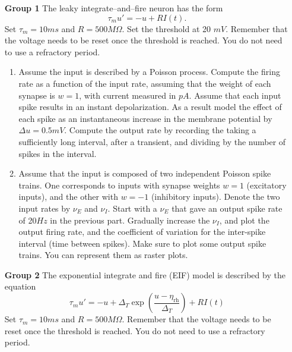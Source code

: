 \documentclass[12pt]{article}
\begin{document}
\begin{enumerate}
\item[\bf Group 1]  The leaky integrate--and--fire neuron has the form
$$
\tau_m u' = - u + R I(t).
$$
Set $\tau_m = 10 ms$ and $R = 500M \Omega$.  Set the threshold at 20 $mV$. Remember that the voltage needs to be reset once the threshold is reached.  You do not need to use a refractory period.   

\begin{enumerate}
\item Assume the input is described by a Poisson process. Compute the firing rate as a function of the input rate, assuming that the weight of each synapse is $w = 1$,
with current measured in $pA$.  Assume that each input spike results in an instant depolarization.  As a result model the effect of each spike as  an instantaneous increase in the membrane potential
by $\Delta u = 0.5mV$.  Compute the output rate by recording the taking a sufficiently long interval, after a transient, and dividing by the 
number of spikes in the interval.
\item Assume that the input is composed of two independent Poisson spike trains.  One corresponds to inputs with synapse weights $w = 1$ (excitatory inputs), and the other with $w = -1$ (inhibitory inputs).  Denote the two input rates by $\nu_E$ and $\nu_I$. Start with a $\nu_E$ that gave an output spike rate of 20$Hz$ in the previous part. Gradually increase the $\nu_I$, and plot the output firing rate, and the coefficient of variation for the inter-spike interval (time between spikes).  Make sure to plot some output spike trains. You can represent them as raster plots.
\end{enumerate}

\item[\bf Group 2] 
The exponential integrate and fire (EIF) model is described by the equation
\begin{equation} \label{E:EIF}
\tau_m u' = - u + \Delta_T \exp \left( \frac{u - \eta_{\text{rh}}}{\Delta_T} \right) + R I(t) 
\end{equation}
Set $\tau_m = 10 ms$ and $R = 500M \Omega$. Remember that the voltage needs to be reset once the threshold is reached.  You do not need to use a refractory period.   


\end{enumerate}
\end{document}
